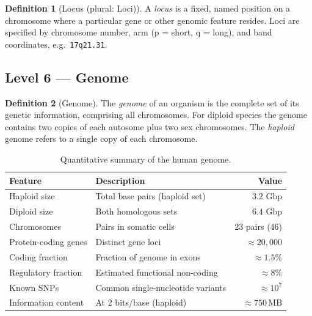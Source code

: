 \documentclass[12pt, a4paper, oneside]{book}
\theoremstyle{definition}
\newtheorem{definition}{Definition}[chapter]
\theoremstyle{remark}
\newcommand{\Gbp}{\,\text{Gbp}}
\begin{document}
\begin{definition}[Locus (plural: Loci)]
A \emph{locus} is a fixed, named position on a chromosome where a
particular gene or other genomic feature resides.
Loci are specified by chromosome number, arm (p = short, q = long),
and band coordinates, e.g.\ \texttt{17q21.31}.
\end{definition}

\subsection{Level 6 — Genome}
\label{subsec:genome}

\begin{definition}[Genome]
The \emph{genome} of an organism is the complete set of its genetic
information, comprising all chromosomes.  For diploid species the genome
contains two copies of each autosome plus two sex chromosomes.
The \emph{haploid} genome refers to a single copy of each chromosome.
\end{definition}

\begin{table}[h]
\centering
\caption{Quantitative summary of the human genome.}
\label{tab:genome-stats}
\begin{tabularx}{\textwidth}{lXr}
\toprule
\textbf{Feature} & \textbf{Description} & \textbf{Value} \\
\midrule
Haploid size         & Total base pairs (haploid set)       & $3.2\,\Gbp$ \\
Diploid size         & Both homologous sets                 & $6.4\,\Gbp$ \\
Chromosomes          & Pairs in somatic cells               & 23 pairs (46) \\
Protein-coding genes & Distinct gene loci                   & $\approx 20{,}000$ \\
Coding fraction      & Fraction of genome in exons          & $\approx 1.5\%$ \\
Regulatory fraction  & Estimated functional non-coding       & $\approx 8\%$ \\
Known SNPs           & Common single-nucleotide variants    & $\approx 10^7$ \\
Information content  & At 2 bits/base (haploid)             & $\approx 750\,\text{MB}$ \\
\bottomrule
\end{tabularx}
\end{table}
\end{document}

